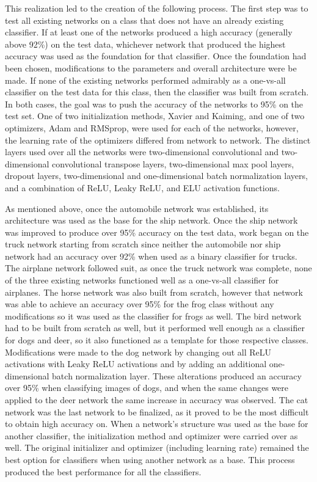 \documentclass[10pt,twocolumn,letterpaper]{article}
\begin{document}
This realization led to the creation of the following process. The first step was to test all existing networks on a class that does not have an already existing classifier. If at least one of the networks produced a high accuracy (generally above 92\%) on the test data, whichever network that produced the highest accuracy was used as the foundation for that classifier. Once the foundation had been chosen, modifications to the parameters and overall architecture were be made. If none of the existing networks performed admirably as a one-vs-all classifier on the test data for this class, then the classifier was built from scratch. In both cases, the goal was to push the accuracy of the networks to 95\% on the test set. One of two initialization methods, Xavier and Kaiming, and one of two optimizers, Adam and RMSprop, were used for each of the networks, however, the learning rate of the optimizers differed from network to network. The distinct layers used over all the networks were two-dimensional convolutional and two-dimensional convolutional transpose layers, two-dimensional max pool layers, dropout layers, two-dimensional and one-dimensional batch normalization layers, and a combination of ReLU, Leaky ReLU, and ELU activation functions.

As mentioned above, once the automobile network was established, its architecture was used as the base for the ship network. Once the ship network was improved to produce over 95\% accuracy on the test data, work began on the truck network starting from scratch since neither the automobile nor ship network had an accuracy over 92\% when used as a binary classifier for trucks. The airplane network followed suit, as once the truck network was complete, none of the three existing networks functioned well as a one-vs-all classifier for airplanes. The horse network was also built from scratch, however that network was able to achieve an accuracy over 95\% for the frog class without any modifications so it was used as the classifier for frogs as well. The bird network had to be built from scratch as well, but it performed well enough as a classifier for dogs and deer, so it also functioned as a template for those respective classes. Modifications were made to the dog network by changing out all ReLU activations with Leaky ReLU activations and by adding an additional one-dimensional batch normalization layer. These alterations produced an accuracy over 95\% when classifying images of dogs, and when the same changes were applied to the deer network the same increase in accuracy was observed. The cat network was the last network to be finalized, as it proved to be the most difficult to obtain high accuracy on. When a network’s structure was used as the base for another classifier, the initialization method and optimizer were carried over as well. The original initializer and optimizer (including learning rate) remained the best option for classifiers when using another network as a base. This process produced the best performance for all the classifiers.
\end{document}
